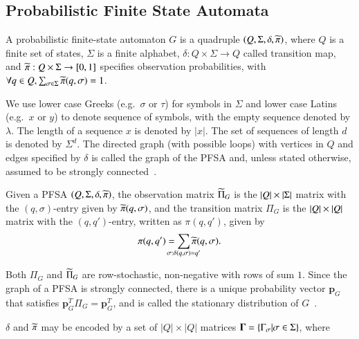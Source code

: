 \documentclass[9pt,journal,compsoc]{IEEEtran}
\begin{document}
{ \subsection{Probabilistic Finite State Automata}
   \begin{defn}[PFSA]
     \label{defn:PFSA}
     A probabilistic finite-state automaton $G$ is a quadruple $\left( Q, \Sigma, \delta, \widetilde{\pi} \right)$, where $Q$ is a finite set of states, $\Sigma$ is a finite alphabet, $\delta:Q\times\Sigma \rightarrow Q$ called transition map, and $\widetilde{\pi}:Q \times \Sigma \rightarrow [0,1]$ specifies observation probabilities, with $\forall q \in Q, \sum_{\sigma \in \Sigma} \widetilde{\pi}(q,\sigma) = 1$.  
   \end{defn}
   We use lower case Greeks (e.g.~$\sigma$ or $\tau$) for symbols in $\Sigma$ and lower case Latins (e.g.~$x$ or $y$) to denote sequence of symbols, with the empty sequence denoted by $\lambda$. 
   The length of a sequence $x$ is denoted by $|x|$. 
   The set of sequences of length $d$ is denoted by $\Sigma^{d}$.
 The directed graph (with possible loops) with vertices in $Q$ and edges specified by $\delta$ is called the graph of the PFSA and, unless stated otherwise, assumed to be strongly connected~\cite{bondy2008graph}.
   \begin{defn}
     Given a PFSA $\left( Q, \Sigma, \delta, \widetilde{\pi} \right)$, the observation matrix $\widetilde{\Pi}_{G}$ is the $\left| Q \right|\times\left| \Sigma \right|$ matrix with the $(q,\sigma)$-entry given by $\widetilde{\pi}(q, \sigma)$, and the transition matrix $\Pi_{G}$ is the $\left| Q \right|\times\left| Q \right|$ matrix with the $(q, q')$-entry, written as $\pi(q, q')$, given by 
    \begin{gather}
       \pi(q, q') = \sum_{\mathclap{\sigma: \delta(q, \sigma)=q'}}\pitilde(q, \sigma).
   \end{gather}%
   \end{defn}%
   Both $\Pi_{G}$ and $\widetilde{\Pi}_{G}$ are row-stochastic, \ie non-negative with rows of sum $1$. 
   Since the graph of a PFSA is strongly connected, there is a unique probability vector $\mathbf{p}_{G}$ that satisfies $\mathbf{p}_{G}^{T}\Pi_{G} = \mathbf{p}_{G}^{T}$, and is called the stationary distribution of $G$~\cite{vidyasagar2014hidden}.  
   \begin{defn}
     \label{defn:GammaExpr}
    $\delta$ and $\widetilde{\pi}$ may be encoded by a set of $|Q| \times |Q|$ matrices $\mathbf{\Gamma} = \left\{ \Gamma_\sigma| \sigma\in\Sigma \right\}$, where
    \begin{gather}

\end{gather}
\end{defn}}
\end{document}
